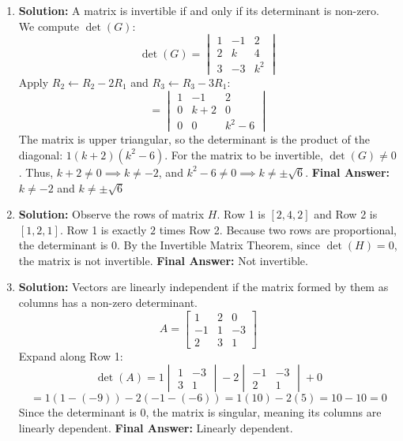 \documentclass[11pt]{article}
\begin{document}
\begin{enumerate}
    \item \textbf{Solution:} A matrix is invertible if and only if its determinant is non-zero. We compute $\det(G)$:
    \[ \det(G) = \begin{vmatrix} 1 & -1 & 2 \\ 2 & k & 4 \\ 3 & -3 & k^2 \end{vmatrix} \]
    Apply $R_2 \leftarrow R_2 - 2R_1$ and $R_3 \leftarrow R_3 - 3R_1$:
    \[ = \begin{vmatrix} 1 & -1 & 2 \\ 0 & k+2 & 0 \\ 0 & 0 & k^2-6 \end{vmatrix} \]
    The matrix is upper triangular, so the determinant is the product of the diagonal: $1(k+2)(k^2-6)$.
    For the matrix to be invertible, $\det(G) \neq 0$.
    Thus, $k+2 \neq 0 \implies k \neq -2$, and $k^2-6 \neq 0 \implies k \neq \pm\sqrt{6}$.
    \textbf{Final Answer:} $k \neq -2$ and $k \neq \pm\sqrt{6}$

    \item \textbf{Solution:} Observe the rows of matrix $H$. Row 1 is $[2, 4, 2]$ and Row 2 is $[1, 2, 1]$. Row 1 is exactly $2$ times Row 2. Because two rows are proportional, the determinant is $0$. By the Invertible Matrix Theorem, since $\det(H) = 0$, the matrix is not invertible.
    \textbf{Final Answer:} Not invertible.

    \item \textbf{Solution:} Vectors are linearly independent if the matrix formed by them as columns has a non-zero determinant.
    \[ A = \begin{bmatrix} 1 & 2 & 0 \\ -1 & 1 & -3 \\ 2 & 3 & 1 \end{bmatrix} \]
    Expand along Row 1:
    \[ \det(A) = 1 \begin{vmatrix} 1 & -3 \\ 3 & 1 \end{vmatrix} - 2 \begin{vmatrix} -1 & -3 \\ 2 & 1 \end{vmatrix} + 0 \]
    \[ = 1(1 - (-9)) - 2(-1 - (-6)) = 1(10) - 2(5) = 10 - 10 = 0 \]
    Since the determinant is $0$, the matrix is singular, meaning its columns are linearly dependent.
    \textbf{Final Answer:} Linearly dependent.


\end{enumerate}
\end{document}
